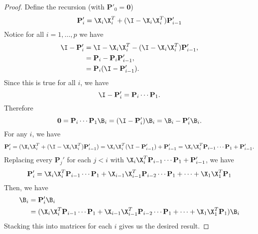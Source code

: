 \begin{proof}
    Define the recursion (with $\mathbf{P}'_0 = \mathbf{0}$)
    \begin{equation*}
        \mathbf{P}_i' = \X_i \X_i^T + (\I - \X_i \X_i^T) \mathbf{P}'_{i-1}
    \end{equation*}
    Notice for all $i=1,\dots,p$ we have
    \begin{align}
        \I -  \mathbf{P}_{i}' &= \I - \X_i \X_i^T - (\I - \X_i \X_i^T) \mathbf{P}'_{i-1},\\
         &=\mathbf{P}_i - \mathbf{P}_i \mathbf{P}'_{i-1},\\
        &=\mathbf{P}_i(\I - \mathbf{P}_{i-1}').
    \end{align}
    Since this is true for all $i$, we have
    \begin{equation}
        \I -  \mathbf{P}_{i}' = \mathbf{P}_i \cdots \mathbf{P}_1.
    \end{equation}
    Therefore
    \begin{equation}
        \mathbf{0} = \mathbf{P}_i \cdots \mathbf{P}_1\B_i = (\I - \mathbf{P}_i')\B_i= \B_i - \mathbf{P}_i' \B_i.
    \end{equation}
    For any $i$, we have
    \begin{equation}
        \mathbf{P}_i' = (\X_i \X_i^T + (\I - \X_i \X_i^T) \mathbf{P}'_{i-1}) = \X_i \X_i^T(\I - \mathbf{P}'_{i-1}) + \mathbf{P}'_{i-1} = \X_i \X_i^T\mathbf{P}_{i-1}\cdots \mathbf{P}_1 + \mathbf{P}'_{i-1}.
    \end{equation}
    Replacing every $\mathbf{P}_j'$ for each $j < i$ with $\X_i \X_i^T\mathbf{P}_{i-1}\cdots \mathbf{P}_1 + \mathbf{P}'_{i-1}$, we have
    \begin{equation}
        \mathbf{P}_i' = \X_i \X_i^T\mathbf{P}_{i-1}\cdots \mathbf{P}_1 + \X_{i-1} \X_{i-1}^T\mathbf{P}_{i-2}\cdots \mathbf{P}_1 + \cdots +\X_1 \X_1^T \mathbf{P}_1
    \end{equation}
    Then, we have 
    \begin{align}
        \B_i & = \mathbf{P}_i' \B_i\\
        &= (\X_i \X_i^T\mathbf{P}_{i-1}\cdots \mathbf{P}_1 + \X_{i-1} \X_{i-1}^T\mathbf{P}_{i-2}\cdots \mathbf{P}_1 + \cdots +\X_1 \X_1^T \mathbf{P}_1)\B_i
    \end{align}
    Stacking this into matrices for each $i$ gives us the desired result.
\end{proof}

